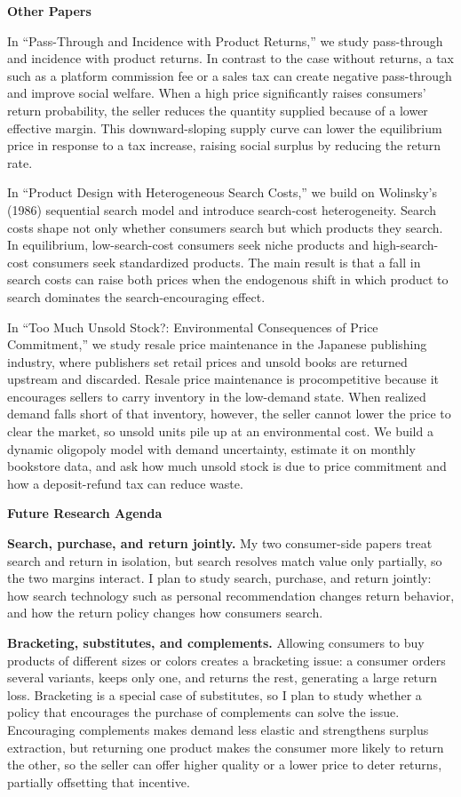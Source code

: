 \documentclass[11pt]{article}
\begin{document}
\textbf{Other Papers}

In ``Pass-Through and Incidence with Product Returns,'' we study pass-through and incidence with product returns. In contrast to the case without returns, a tax such as a platform commission fee or a sales tax can create negative pass-through and improve social welfare. When a high price significantly raises consumers' return probability, the seller reduces the quantity supplied because of a lower effective margin. This downward-sloping supply curve can lower the equilibrium price in response to a tax increase, raising social surplus by reducing the return rate.

In ``Product Design with Heterogeneous Search Costs,'' we build on Wolinsky's (1986) sequential search model and introduce search-cost heterogeneity. Search costs shape not only whether consumers search but which products they search. In equilibrium, low-search-cost consumers seek niche products and high-search-cost consumers seek standardized products. The main result is that a fall in search costs can raise both prices when the endogenous shift in which product to search dominates the search-encouraging effect.

In ``Too Much Unsold Stock?: Environmental Consequences of Price Commitment,'' we study resale price maintenance in the Japanese publishing industry, where publishers set retail prices and unsold books are returned upstream and discarded. Resale price maintenance is procompetitive because it encourages sellers to carry inventory in the low-demand state. When realized demand falls short of that inventory, however, the seller cannot lower the price to clear the market, so unsold units pile up at an environmental cost. We build a dynamic oligopoly model with demand uncertainty, estimate it on monthly bookstore data, and ask how much unsold stock is due to price commitment and how a deposit-refund tax can reduce waste.

\textbf{Future Research Agenda}

\textbf{Search, purchase, and return jointly.} My two consumer-side papers treat search and return in isolation, but search resolves match value only partially, so the two margins interact. I plan to study search, purchase, and return jointly: how search technology such as personal recommendation changes return behavior, and how the return policy changes how consumers search.

\textbf{Bracketing, substitutes, and complements.} Allowing consumers to buy products of different sizes or colors creates a bracketing issue: a consumer orders several variants, keeps only one, and returns the rest, generating a large return loss. Bracketing is a special case of substitutes, so I plan to study whether a policy that encourages the purchase of complements can solve the issue. Encouraging complements makes demand less elastic and strengthens surplus extraction, but returning one product makes the consumer more likely to return the other, so the seller can offer higher quality or a lower price to deter returns, partially offsetting that incentive.
\end{document}
